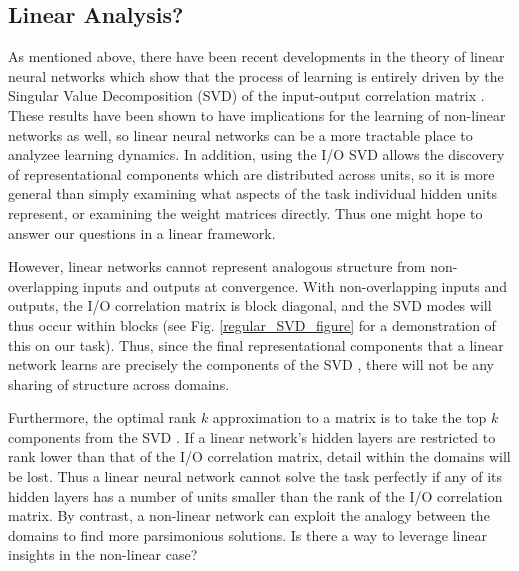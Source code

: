 \documentclass[10pt,letterpaper]{article}
\begin{document}
\subsection{Linear Analysis?}
As mentioned above, there have been recent developments in the theory of linear neural networks which show that the process of learning is entirely driven by the Singular Value Decomposition (SVD) of the input-output correlation matrix \citep{Saxe2013}. These results have been shown to have implications for the learning of non-linear networks as well, so linear neural networks can be a more tractable place to analyzee learning dynamics. In addition, using the I/O SVD allows the discovery of representational components which are distributed across units, so it is more general than simply examining what aspects of the task individual hidden units represent, or examining the weight matrices directly. Thus one might hope to answer our questions in a linear framework. \par
However, linear networks cannot represent analogous structure from non-overlapping inputs and outputs at convergence. With non-overlapping inputs and outputs, the I/O correlation matrix is block diagonal, and the SVD modes will thus occur within blocks (see Fig. \ref{regular_SVD_figure} for a demonstration of this on our task). Thus, since the final representational components that a linear network learns are precisely the components of the SVD \citep{Saxe2013}, there will not be any sharing of structure across domains.\par 
Furthermore, the optimal rank $k$ approximation to a matrix is to take the top $k$ components from the SVD \citep{Mirsky1960}. If a linear network's hidden layers are restricted to rank lower than that of the I/O correlation matrix, detail within the domains will be lost. Thus a linear neural network cannot solve the task perfectly if any of its hidden layers has a number of units smaller than the rank of the I/O correlation matrix. By contrast, a non-linear network can exploit the analogy between the domains to find more parsimonious solutions. Is there a way to leverage linear insights in the non-linear case?  
\end{document}
